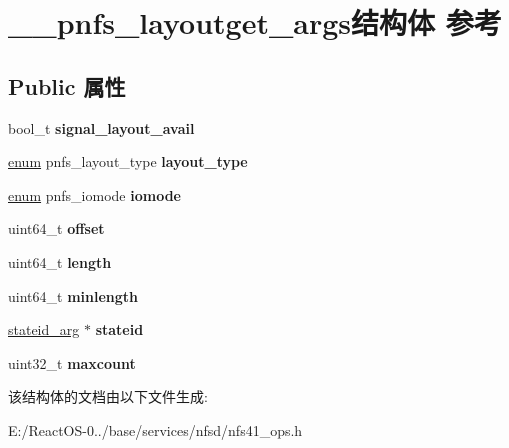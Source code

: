 \hypertarget{struct____pnfs__layoutget__args}{}\section{\+\_\+\+\_\+pnfs\+\_\+layoutget\+\_\+args结构体 参考}
\label{struct____pnfs__layoutget__args}
\subsection*{Public 属性}
\begin{DoxyCompactItemize}
\item 
\mbox{\label{struct____pnfs__layoutget__args_a39f49282445ac8e77f0eb6e7d156b243}} 
bool\+\_\+t {\bfseries signal\+\_\+layout\+\_\+avail}
\item 
\mbox{\label{struct____pnfs__layoutget__args_a671a59630ba1c8023980b120659715e8}} 
\hyperlink{interfaceenum}{enum} pnfs\+\_\+layout\+\_\+type {\bfseries layout\+\_\+type}
\item 
\mbox{\label{struct____pnfs__layoutget__args_a38d830e7c70f68e847993f8fff35fedc}} 
\hyperlink{interfaceenum}{enum} pnfs\+\_\+iomode {\bfseries iomode}
\item 
\mbox{\label{struct____pnfs__layoutget__args_a4252c2122249433c118721e0c44df71b}} 
uint64\+\_\+t {\bfseries offset}
\item 
\mbox{\label{struct____pnfs__layoutget__args_a13a5365612c418c3154a85a049ecf361}} 
uint64\+\_\+t {\bfseries length}
\item 
\mbox{\label{struct____pnfs__layoutget__args_ace43c69108e9782d8381857a4f741433}} 
uint64\+\_\+t {\bfseries minlength}
\item 
\mbox{\label{struct____pnfs__layoutget__args_ae2ffb5fb0a8ce9baeccb48e06a5e0e5c}} 
\hyperlink{struct____stateid__arg}{stateid\+\_\+arg} $\ast$ {\bfseries stateid}
\item 
\mbox{\label{struct____pnfs__layoutget__args_aa752b688a35e18764126ca9c6627b50e}} 
uint32\+\_\+t {\bfseries maxcount}
\end{DoxyCompactItemize}


该结构体的文档由以下文件生成\+:\begin{DoxyCompactItemize}
\item 
E\+:/\+React\+O\+S-\/0../base/services/nfsd/nfs41\+\_\+ops.\+h\end{DoxyCompactItemize}
